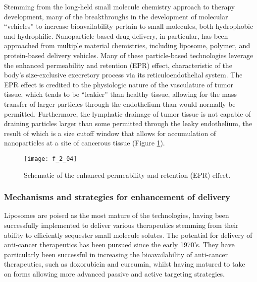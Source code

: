 \begin{refsection}
Stemming from the long-held small molecule chemistry approach to therapy development,
many of the breakthroughs in the development of molecular ``vehicles'' to
increase bioavailability pertain to small molecules, both hydrophobic and
hydrophilic. Nanoparticle-based drug delivery, in particular, has been
approached from multiple material chemistries, including liposome, polymer, and
protein-based delivery vehicles. Many of these particle-based technologies
leverage the enhanced permeability and retention (EPR) effect, characteristic of
the body's size-exclusive execretory process via its reticuloendothelial
system.\cite{Matsumura1986,Fang2010} The EPR effect is credited to the
physiologic nature of the vasculature of tumor tissue, which tends to be
``leakier'' than healthy tissue, allowing for the mass transfer of larger
particles through the endothelium than would normally be permitted. Furthermore,
the lymphatic drainage of tumor tissue is not capable of draining particles
larger than some permitted through the leaky endothelium, the result of which
is a size cutoff window that allows for accumulation of nanoparticles at a site
of cancerous tissue (Figure \ref{fig:EPR_effect}).
\begin{figure}[h!] \centering \texttt{[image: f\_2\_04]}
    \caption{Schematic of the enhanced permeability and retention (EPR)
    effect.}\label{fig:EPR_effect} \end{figure}

\subsubsection{Mechanisms and strategies for enhancement of delivery}
Liposomes are poised as the most mature of the technologies, having been
successfully implemented to deliver various therapeutics stemming from their
ability to efficiently sequester small molecule
solutes.\cite{Ranson1996,Sessa1968,Bangham1965,Bangham1974} The potential for
delivery of anti-cancer therapeutics has been pursued since the early
1970's.\cite{Gregoriadis1974} They have particularly been successful in
increasing the bioavailability of anti-cancer therapeutics, such as doxorubicin
and curcumin, whilst having matured to take on forms allowing more advanced
passive and active targeting strategies.\cite{Al-Jamal2012,Huang1994,Li2007}


\end{refsection}
